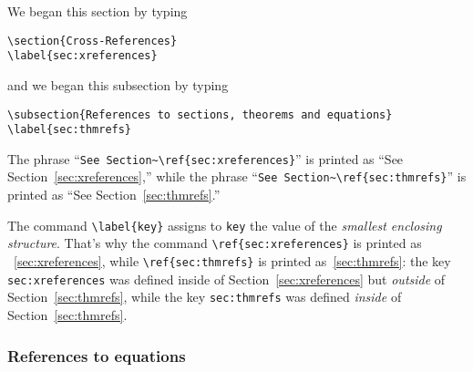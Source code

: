 We began this section by typing
\begin{verbatim}
\section{Cross-References}
\label{sec:xreferences}
\end{verbatim}
and we began this subsection by typing
\begin{verbatim}
\subsection{References to sections, theorems and equations}
\label{sec:thmrefs}
\end{verbatim}
The phrase ``\verb"See Section~\ref{sec:xreferences}"'' is
printed as ``See Section~\ref{sec:xreferences},'' while the phrase
``\verb"See Section~\ref{sec:thmrefs}"'' is printed as
``See Section~\ref{sec:thmrefs}.''


The command \verb"\label{key}" assigns to \verb"key" the value of the
{\em smallest enclosing structure}.  That's why the command
\verb"\ref{sec:xreferences}" is printed
as ~\ref{sec:xreferences}, while
\verb"\ref{sec:thmrefs}" is printed as~\ref{sec:thmrefs}:
the key \verb"sec:xreferences" was defined inside of
Section~\ref{sec:xreferences} but {\em outside\/} of
Section~\ref{sec:thmrefs}, while the key \verb"sec:thmrefs" was
defined {\em inside\/} of Section~\ref{sec:thmrefs}.


\subsubsection*{References to equations}

